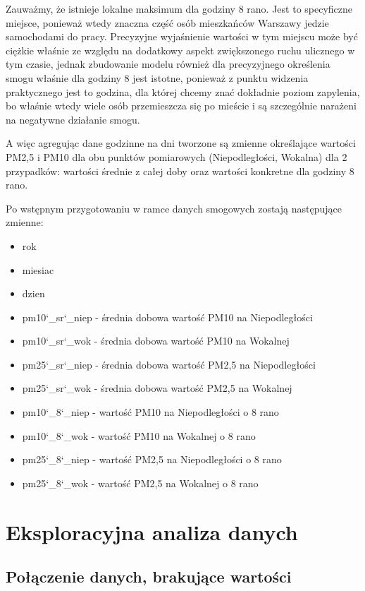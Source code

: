\documentclass[a4paper,12pt,twoside,openany]{report}
\begin{document}
Zauważmy, że istnieje lokalne maksimum dla godziny 8 rano. Jest to specyficzne miejsce, ponieważ wtedy znaczna część osób mieszkańców Warszawy jedzie samochodami do pracy. Precyzyjne wyjaśnienie wartości w tym miejscu może być ciężkie właśnie ze względu na dodatkowy aspekt zwiększonego ruchu ulicznego w tym czasie, jednak zbudowanie modelu również dla precyzyjnego określenia smogu właśnie dla godziny 8 jest istotne, ponieważ z punktu widzenia praktycznego jest to godzina, dla której chcemy znać dokładnie poziom zapylenia, bo właśnie wtedy wiele osób przemieszcza się po mieście i są szczególnie narażeni na negatywne działanie smogu.

A więc agregując dane godzinne na dni tworzone są zmienne określające wartości PM2,5 i PM10 dla obu punktów pomiarowych (Niepodległości, Wokalna) dla 2 przypadków: wartości średnie z całej doby oraz wartości konkretne dla godziny 8 rano.

Po wstępnym przygotowaniu w ramce danych smogowych zostają następujące zmienne:

\begin{itemize}
	\item rok
	\item miesiac
	\item dzien
	\item pm10\char`_sr\char`_niep - średnia dobowa wartość PM10 na Niepodległości
	\item pm10\char`_sr\char`_wok - średnia dobowa wartość PM10 na Wokalnej
	\item pm25\char`_sr\char`_niep - średnia dobowa wartość PM2,5 na Niepodległości
	\item pm25\char`_sr\char`_wok - średnia dobowa wartość PM2,5 na Wokalnej
	\item pm10\char`_8\char`_niep - wartość PM10 na Niepodległości o 8 rano
	\item pm10\char`_8\char`_wok - wartość PM10 na Wokalnej o 8 rano
	\item pm25\char`_8\char`_niep - wartość PM2,5 na Niepodległości o 8 rano
	\item pm25\char`_8\char`_wok - wartość PM2,5 na Wokalnej o 8 rano
	
\end{itemize}

\chapter{Eksploracyjna analiza danych}

\section{Połączenie danych, brakujące wartości}
\end{document}
